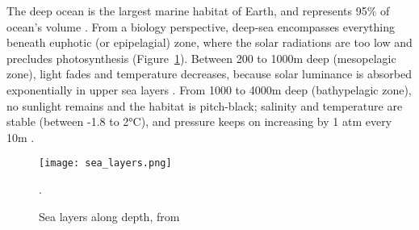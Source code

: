 




The deep ocean is the largest marine habitat of Earth, and represents 95\% of ocean's volume \citep{danovaro2017,salazar2016,webb2010}. From a biology perspective, deep-sea encompasses everything beneath euphotic (or epipelagial) zone, where the solar radiations are too low and precludes photosynthesis \citep{baker2020,danovaro2017,salazar2016} (Figure~\ref{fig:dsl}). Between 200 to 1000m deep (mesopelagic zone), light fades and temperature decreases, because solar luminance is absorbed exponentially in upper sea layers \citep{reynolds2001}. From 1000 to 4000m deep (bathypelagic zone), no sunlight remains and the habitat is pitch-black; salinity and temperature are stable (between -1.8 to 2°C), and pressure keeps on increasing by 1 atm every 10m \citep{danovaro2017}. 

\begin{figure} [!htbp]
	\begin{center}
		\texttt{[image: sea\_layers.png]}
	\end{center}
	\caption[Sea layers]{Sea layers along depth, from \citep{fig_deep_sea}}.
	\label{fig:dsl}
\end{figure}


